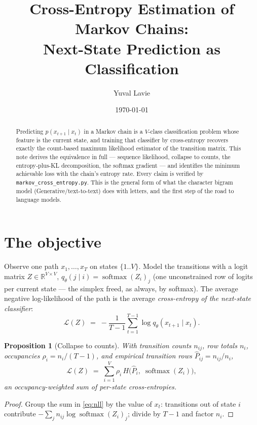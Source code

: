 \documentclass[11pt]{article}
\title{Cross-Entropy Estimation of Markov Chains:\\
Next-State Prediction as Classification}
\author{Yuval Lavie}
\date{\today}
\newtheorem{proposition}{Proposition}
\theoremstyle{remark}
\newcommand{\smax}{\operatorname{softmax}}
\begin{document}
\maketitle

\begin{abstract}
Predicting $p(x_{t+1} \mid x_t)$ in a Markov chain is a $V$-class
classification problem whose feature is the current state, and
training that classifier by cross-entropy recovers exactly the
count-based maximum likelihood estimator of the transition matrix.
This note derives the equivalence in full --- sequence likelihood,
collapse to counts, the entropy-plus-KL decomposition, the softmax
gradient --- and identifies the minimum achievable loss with the
chain's entropy rate. Every claim is verified by
\texttt{markov\_cross\_entropy.py}. This is the general form of what
the character bigram model (\textnormal{Generative/text-to-text})
does with letters, and the first step of the road to language models.
\end{abstract}

\section{The objective}

Observe one path $x_1, \dots, x_T$ on states $\{1..V\}$. Model the
transitions with a logit matrix $Z \in \mathbb{R}^{V \times V}$,
$q_\theta(j \mid i) = \smax(Z_i)_j$ (one unconstrained row of logits
per current state --- the simplex freed, as always, by softmax). The
average negative log-likelihood of the path is the average
\emph{cross-entropy of the next-state classifier}:
\begin{equation}
  \mathcal{L}(Z)
  \;=\; -\frac{1}{T-1} \sum_{t=1}^{T-1}
        \log q_\theta(x_{t+1} \mid x_t).
  \label{eq:nll}
\end{equation}

\begin{proposition}[Collapse to counts]
With transition counts $n_{ij}$, row totals $n_i$, occupancies
$\rho_i = n_i / (T{-}1)$, and empirical transition rows
$\hat P_{ij} = n_{ij}/n_i$,
\begin{equation}
  \mathcal{L}(Z)
  \;=\; \sum_{i=1}^{V} \rho_i \, H\bigl(\hat P_i,\; \smax(Z_i)\bigr),
  \label{eq:collapse}
\end{equation}
an occupancy-weighted sum of per-state cross-entropies.
\end{proposition}

\begin{proof}
Group the sum in \eqref{eq:nll} by the value of $x_t$: transitions
out of state $i$ contribute $-\sum_j n_{ij} \log \smax(Z_i)_j$;
divide by $T-1$ and factor $n_i$.
\end{proof}
\end{document}

